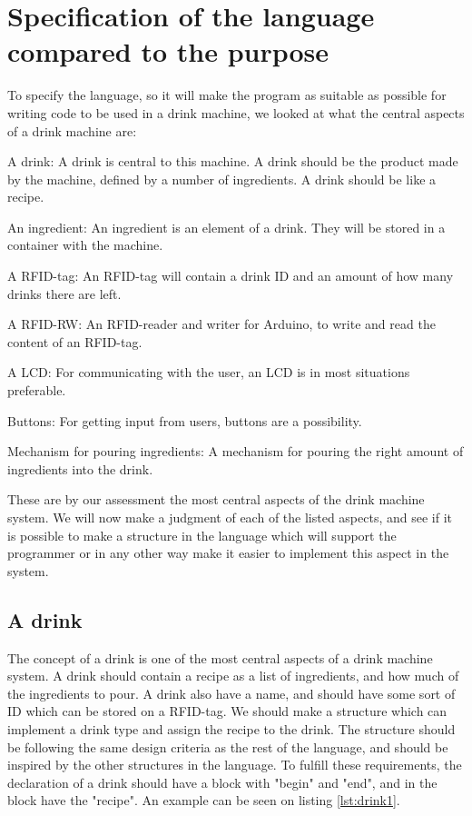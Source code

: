 \section{Specification of the language compared to the purpose}
To specify the language, so it will make the program as suitable as possible for writing code to be used in a drink machine, we looked at what the central aspects of a drink machine are:
\begin{inddes}
\item[A drink:] A drink is central to this machine. A drink should be the product made by the machine, defined by a number of ingredients. A drink should be like a recipe.
\item[An ingredient:] An ingredient is an element of a drink. They will be stored in a container with the machine. 
\item[A RFID-tag:] An RFID-tag will contain a drink ID and an amount of how many drinks there are left.
\item[A RFID-RW:] An RFID-reader and writer for Arduino, to write and read the content of an RFID-tag.
\item[A LCD:] For communicating with the user, an LCD is in most situations preferable.
\item[Buttons:] For getting input from users, buttons are a possibility. 
\item[Mechanism for pouring ingredients:] A mechanism for pouring the right amount of ingredients into the drink.
\end{inddes}
These are by our assessment the most central aspects of the drink machine system. We will now make a judgment of each of the listed aspects, and see if it is possible to make a structure in the language which will support the programmer or in any other way make it easier to implement this aspect in the system.
\subsection{A drink}
The concept of a drink is one of the most central aspects of a drink machine system. A drink should contain a recipe as a list of ingredients, and how much of the ingredients to pour. A drink also have a name, and should have some sort of ID which can be stored on a RFID-tag. We should make a structure which can implement a drink type and assign the recipe to the drink. The structure should be following the same design criteria as the rest of the language, and should be inspired by the other structures in the language. To fulfill these requirements, the declaration of a drink should have a block with "begin" and "end", and in the block have the "recipe". An example can be seen on listing \ref{lst:drink1}.

